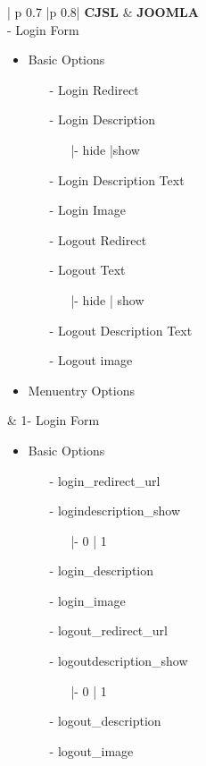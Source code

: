 \begin{minipage}{0.7\textwidth}
\begin{longtable}{| p {0.7\textwidth} |p {0.8\textwidth}|}
\hline
\textbf{CJSL}
&  
\textbf{JOOMLA} \\ - Login Form 
\begin{itemize}
\item Basic Options
	\begin{enumerate}
	\item[-]  Login Redirect
	\item[-]  Login Description
	\begin{enumerate}
	\item[|-]hide |show 
	\end{enumerate}
	\item[-]  Login Description Text 
	\item[-]  Login Image 
	\item[-]  Logout Redirect 
	\item[-]  Logout Text
	\begin{enumerate}
		\item[|-]hide | show
	\end{enumerate} 
	\item[-]  Logout Description Text 
	\item[-]  Logout image 
	\end{enumerate}
\item Menuentry Options
\end{itemize} 
&
1- Login Form 
\begin{itemize}
\item Basic Options
	\begin{enumerate}
	\item[-]  login\_redirect\_url
	\item[-]  logindescription\_show
	\begin{enumerate}
	\item[|-]0 | 1
	\end{enumerate}
	\item[-]  login\_description 
	\item[-]  login\_image 
	\item[-]  logout\_redirect\_url 
	\item[-]  logoutdescription\_show
	\begin{enumerate}
		\item[|-]0 | 1
	\end{enumerate} 
	\item[-]  logout\_description 
	\item[-]  logout\_image 

\end{enumerate}
\end{itemize}
\end{longtable}
\end{minipage}
